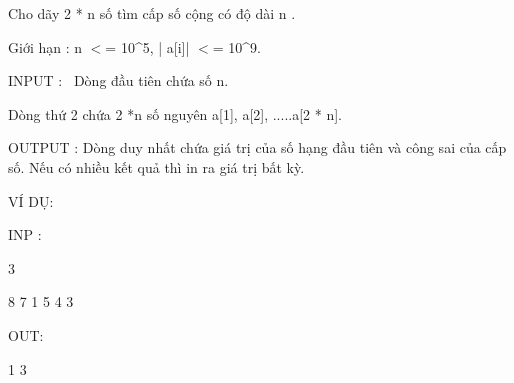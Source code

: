 



   Cho dãy 2 * n số tìm cấp số cộng có độ dài n .  

   Giới hạn : n $<$= 10\textasciicircum5, | a[i]| $<$= 10\textasciicircum9.  

   INPUT :  Dòng đầu tiên chứa số n.  

   Dòng thứ 2 chứa 2 *n số nguyên a[1], a[2], .....a[2 * n].  

   OUTPUT : Dòng duy nhất chứa giá trị của số hạng đầu tiên và công sai của cấp số. Nếu có nhiều kết quả thì in ra giá trị bất kỳ.  

   VÍ DỤ:  

   INP :  

   3  

   8 7 1 5 4 3  

   OUT:  

   1 3  
